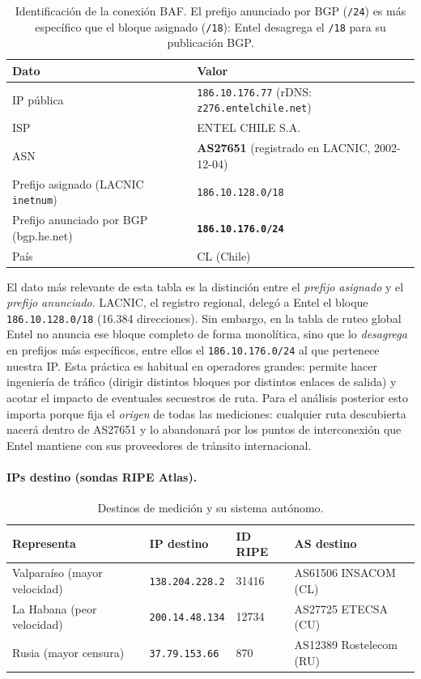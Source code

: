 \documentclass[11pt,a4paper]{article}
\newcommand{\ip}[1]{\texttt{#1}}
\begin{document}
\begin{table}[H]
\centering
\begin{tabularx}{\textwidth}{l X}
\toprule
\textbf{Dato} & \textbf{Valor} \\
\midrule
IP pública & \ip{186.10.176.77} (rDNS: \texttt{z276.entelchile.net}) \\
ISP & ENTEL CHILE S.A. \\
ASN & \textbf{AS27651} (registrado en LACNIC, 2002-12-04) \\
Prefijo asignado (LACNIC \texttt{inetnum}) & \ip{186.10.128.0/18} \\
Prefijo anunciado por BGP (bgp.he.net) & \textbf{\ip{186.10.176.0/24}} \\
País & CL (Chile) \\
\bottomrule
\end{tabularx}
\caption{Identificación de la conexión BAF. El prefijo anunciado por BGP (\ip{/24}) es más
específico que el bloque asignado (\ip{/18}): Entel desagrega el \ip{/18} para su publicación BGP.}
\end{table}

El dato más relevante de esta tabla es la distinción entre el \emph{prefijo asignado} y el
\emph{prefijo anunciado}. LACNIC, el registro regional, delegó a Entel el bloque
\ip{186.10.128.0/18} (16.384 direcciones). Sin embargo, en la tabla de ruteo global Entel no
anuncia ese bloque completo de forma monolítica, sino que lo \emph{desagrega} en prefijos más
específicos, entre ellos el \ip{186.10.176.0/24} al que pertenece nuestra IP. Esta práctica es
habitual en operadores grandes: permite hacer ingeniería de tráfico (dirigir distintos bloques
por distintos enlaces de salida) y acotar el impacto de eventuales secuestros de ruta. Para el
análisis posterior esto importa porque fija el \emph{origen} de todas las mediciones: cualquier
ruta descubierta nacerá dentro de AS27651 y lo abandonará por los puntos de interconexión que
Entel mantiene con sus proveedores de tránsito internacional.

\paragraph{IPs destino (sondas RIPE Atlas).}
\begin{table}[H]
\centering
\begin{tabular}{llll}
\toprule
\textbf{Representa} & \textbf{IP destino} & \textbf{ID RIPE} & \textbf{AS destino} \\
\midrule
Valparaíso (mayor velocidad) & \ip{138.204.228.2} & 31416 & AS61506 INSACOM (CL) \\
La Habana (peor velocidad) & \ip{200.14.48.134} & 12734 & AS27725 ETECSA (CU) \\
Rusia (mayor censura) & \ip{37.79.153.66} & 870 & AS12389 Rostelecom (RU) \\
\bottomrule
\end{tabular}
\caption{Destinos de medición y su sistema autónomo.}
\end{table}
\end{document}
